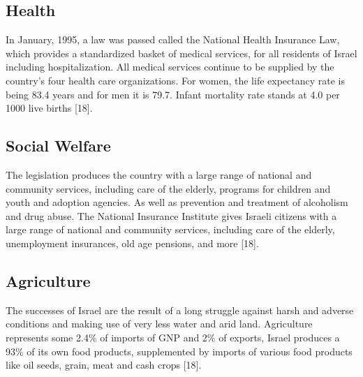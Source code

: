 \documentclass[10pt]{article}
\begin{document}
\subsection{Health}
In January, 1995, a law was passed called the National Health Insurance Law, which provides a standardized basket of medical services, for all residents of Israel including hospitalization. All medical services continue to be supplied by the country's four health care organizations. For women, the life expectancy rate is being 83.4 years and for men it is 79.7. Infant mortality rate stands at 4.0 per 1000 live births [18].
 
\subsection{Social Welfare}
The legislation produces the country with a large range of national and community services, including care of the elderly, programs for children and youth and adoption agencies. As well as prevention and treatment of alcoholism and drug abuse. The National Insurance Institute gives Israeli citizens with a large range of national and community services, including care of the elderly, unemployment insurances, old age pensions, and more [18]. 
 
\subsection{Agriculture}
The successes of Israel are the result of a long struggle against harsh and adverse conditions and making use of very less water and arid land. Agriculture represents some 2.4\% of imports of GNP and 2\% of exports, Israel produces a 93\% of its own food products, supplemented by imports of various food products like oil seeds, grain, meat and cash crops [18].
\end{document}
